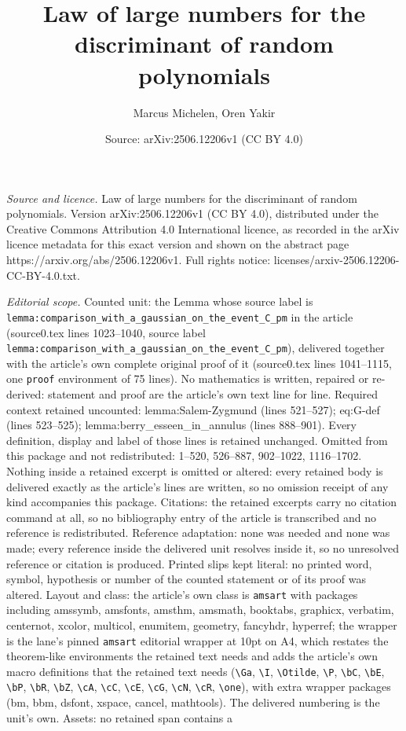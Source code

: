 \documentclass[10pt,a4paper]{amsart}
\title[Law of large numbers for the discriminant of random polynomi]{Law of large numbers for the discriminant of random polynomials}
\author{Marcus Michelen, Oren Yakir}
\date{Source: arXiv:2506.12206v1 (CC BY 4.0)}
\begin{document}
\maketitle

\noindent\emph{Source and licence.} Law of large numbers for the discriminant of random polynomials. Version arXiv:2506.12206v1 (CC BY 4.0), distributed under the Creative Commons Attribution 4.0 International licence, as recorded in the arXiv licence metadata for this exact version and shown on the abstract page https://arxiv.org/abs/2506.12206v1. Full rights notice: licenses/arxiv-2506.12206-CC-BY-4.0.txt.\par\smallskip

\noindent\textit{Editorial scope.} Counted unit: the Lemma whose source label is \texttt{lemma:comparison\_with\_a\_gaussian\_on\_the\_event\_C\_pm} in the article (source0.tex lines 1023--1040, source label \texttt{lemma:comparison\_with\_a\_gaussian\_on\_the\_event\_C\_pm}), delivered together with the article's own complete original proof of it (source0.tex lines 1041--1115, one \texttt{proof} environment of 75 lines). No mathematics is written, repaired or re-derived: statement and proof are the article's own text line for line. Required context retained uncounted: lemma:Salem-Zygmund (lines 521--527); eq:G-def (lines 523--525); lemma:berry\_esseen\_in\_annulus (lines 888--901). Every definition, display and label of those lines is retained unchanged. Omitted from this package and not redistributed: 1--520, 526--887, 902--1022, 1116--1702. Nothing inside a retained excerpt is omitted or altered: every retained body is delivered exactly as the article's lines are written, so no omission receipt of any kind accompanies this package. Citations: the retained excerpts carry no citation command at all, so no bibliography entry of the article is transcribed and no reference is redistributed. Reference adaptation: none was needed and none was made; every reference inside the delivered unit resolves inside it, so no unresolved reference or citation is produced. Printed slips kept literal: no printed word, symbol, hypothesis or number of the counted statement or of its proof was altered. Layout and class: the article's own class is \texttt{amsart} with packages including amssymb, amsfonts, amsthm, amsmath, booktabs, graphicx, verbatim, centernot, xcolor, multicol, enumitem, geometry, fancyhdr, hyperref; the wrapper is the lane's pinned \texttt{amsart} editorial wrapper at 10pt on A4, which restates the theorem-like environments the retained text needs and adds the article's own macro definitions that the retained text needs (\texttt{\textbackslash Ga}, \texttt{\textbackslash I}, \texttt{\textbackslash Otilde}, \texttt{\textbackslash P}, \texttt{\textbackslash bC}, \texttt{\textbackslash bE}, \texttt{\textbackslash bP}, \texttt{\textbackslash bR}, \texttt{\textbackslash bZ}, \texttt{\textbackslash cA}, \texttt{\textbackslash cC}, \texttt{\textbackslash cE}, \texttt{\textbackslash cG}, \texttt{\textbackslash cN}, \texttt{\textbackslash cR}, \texttt{\textbackslash one}), with extra wrapper packages (bm, bbm, dsfont, xspace, cancel, mathtools). The delivered numbering is the unit's own. Assets: no retained span contains a 
\end{document}
